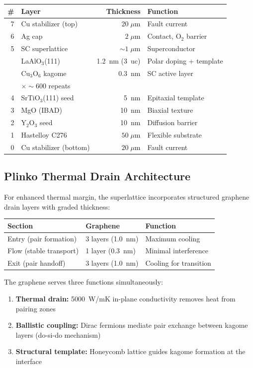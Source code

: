 \documentclass[11pt, a4paper]{article}
\begin{document}
\begin{center}
\begin{tabular}{@{}rp{5cm}rl@{}}
\toprule
\textbf{\#} & \textbf{Layer} & \textbf{Thickness} &
  \textbf{Function} \\
\midrule
7 & Cu stabilizer (top) & $20\;\mu$m & Fault current \\
6 & Ag cap & $2\;\mu$m & Contact, O$_2$ barrier \\
5 & SC superlattice & $\sim 1\;\mu$m & Superconductor \\
  & \quad LaAlO$_3$(111) & 1.2~nm (3~uc) & Polar doping +
    template \\
  & \quad Cu$_3$O$_6$ kagome & 0.3~nm & SC active layer \\
  & \quad $\times \sim 600$ repeats & & \\
4 & SrTiO$_3$(111) seed & 5~nm & Epitaxial template \\
3 & MgO (IBAD) & 10~nm & Biaxial texture \\
2 & Y$_2$O$_3$ seed & 10~nm & Diffusion barrier \\
1 & Hastelloy C276 & $50\;\mu$m & Flexible substrate \\
0 & Cu stabilizer (bottom) & $20\;\mu$m & Fault current \\
\bottomrule
\end{tabular}
\end{center}

\subsection{Plinko Thermal Drain Architecture}

For enhanced thermal margin, the superlattice incorporates
structured graphene drain layers with graded thickness:

\begin{center}
\begin{tabular}{@{}lll@{}}
\toprule
\textbf{Section} & \textbf{Graphene} & \textbf{Function} \\
\midrule
Entry (pair formation) & 3 layers (1.0~nm) & Maximum cooling \\
Flow (stable transport) & 1 layer (0.3~nm) & Minimal interference \\
Exit (pair handoff) & 3 layers (1.0~nm) & Cooling for transition \\
\bottomrule
\end{tabular}
\end{center}

The graphene serves three functions simultaneously:
\begin{enumerate}[nosep]
  \item \textbf{Thermal drain:} 5000~W/mK in-plane conductivity
        removes heat from pairing zones
  \item \textbf{Ballistic coupling:} Dirac fermions mediate
        pair exchange between kagome layers (do-si-do mechanism)
  \item \textbf{Structural template:} Honeycomb lattice guides
        kagome formation at the interface
\end{enumerate}
\end{document}
